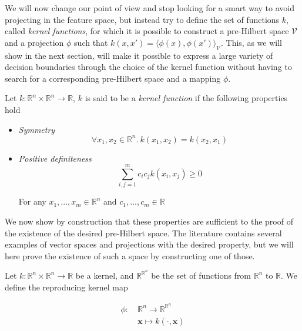 We will now change our point of view and stop looking for a smart way to avoid projecting in the feature space, but instead try to define the set of functions $k$, called \textit{kernel functions}, for which it is possible to construct a pre-Hilbert space $\mathcal{V}$ and a projection $\phi$ such that $k(x, x') = \langle\phi(x), \phi(x')\rangle_{\mathcal{V}}$. This, as we will show in the next section, will make it possible to express a large variety of decision boundaries through the choice of the kernel function without having to search for a corresponding pre-Hilbert space and a mapping $\phi$.

Let $k :\mathbb{R}^n \times \mathbb{R}^n \rightarrow \mathbb{R}$, $k$ is said to be a \textit{kernel function} if the following properties hold

\begin{itemize}
\item \textit{Symmetry}
  \begin{equation*}
    \forall x_1, x_2 \in \mathbb{R}^n.\ 
    k\left(x_1, x_2\right) = k\left(x_2, x_1\right)
  \end{equation*}

\item \textit{Positive definiteness}
  \begin{equation*}
    \sum_{i,j=1}^mc_ic_jk\left(x_i, x_j\right) \geq 0
  \end{equation*}

  For any $x_1, ..., x_m \in \mathbb{R}^n$ and $c_1, ..., c_m \in \mathbb{R}$  
\end{itemize}

We now show by construction that these properties are sufficient to the proof of the existence of the desired pre-Hilbert space. The literature contains several examples of vector spaces and projections with the desired property, but we will here prove the existence of such a space by constructing one of those.

Let $k : \mathbb{R}^n \times \mathbb{R}^n \rightarrow \mathbb{R}$ be a kernel, and $\mathbb{R}^{\mathbb{R}^n}$ be the set of functions from $\mathbb{R}^n$ to $\mathbb{R}$. We define the reproducing kernel map

\begin{equation}
  \begin{aligned}
    \phi :\ &\mathbb{R}^n \rightarrow \mathbb{R}^{\mathbb{R}^n}\\
    &\mathbf{x} \mapsto k(\cdot, \mathbf{x})
  \end{aligned}
\end{equation}

